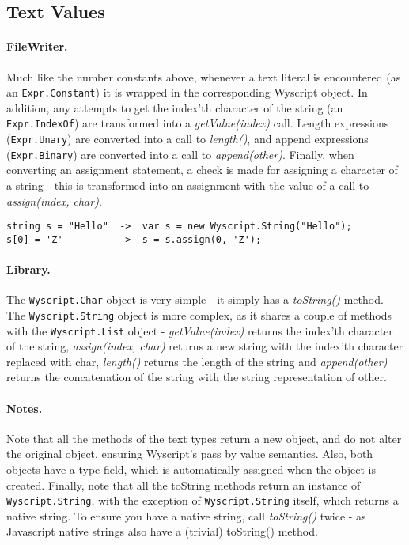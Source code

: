 
\subsection{Text Values}
\label{c_types_text}

\paragraph{FileWriter.} Much like the number constants above, whenever a text literal is encountered (as an \lstinline{Expr.Constant}) it is wrapped in the corresponding Wyscript object. In addition, any attempts to get the index'th character of the string (an \lstinline{Expr.IndexOf}) are transformed into a {\em getValue(index)} call. Length expressions (\lstinline{Expr.Unary}) are converted into a call to {\em length()}, and append expressions (\lstinline{Expr.Binary}) are converted into a call to {\em append(other)}. Finally, when converting an assignment statement, a check is made for assigning a character of a string - this is transformed into an assignment with the value of a call to {\em assign(index, char)}.

\begin{lstlisting}
string s = "Hello"  ->  var s = new Wyscript.String("Hello");
s[0] = 'Z'          ->  s = s.assign(0, 'Z');
\end{lstlisting}

\paragraph{Library.} The \lstinline{Wyscript.Char} object is very simple - it simply has a {\em toString()} method. The \lstinline{Wyscript.String} object is more complex, as it shares a couple of methods with the \lstinline{Wyscript.List} object - {\em getValue(index)} returns the index'th character of the string, {\em assign(index, char)} returns a new string with the index'th character replaced with char, {\em length()} returns the length of the string and {\em append(other)} returns the concatenation of the string with the string representation of other.

\paragraph{Notes.} Note that all the methods of the text types return a new object, and do not alter the original object, ensuring Wyscript's pass by value semantics. Also, both objects have a type field, which is automatically assigned when the object is created. Finally, note that all the toString methods return an instance of \lstinline{Wyscript.String}, with the exception of \lstinline{Wyscript.String} itself, which returns a native string. To ensure you have a native string, call {\em toString()} twice - as Javascript native strings also have a (trivial) toString() method.

